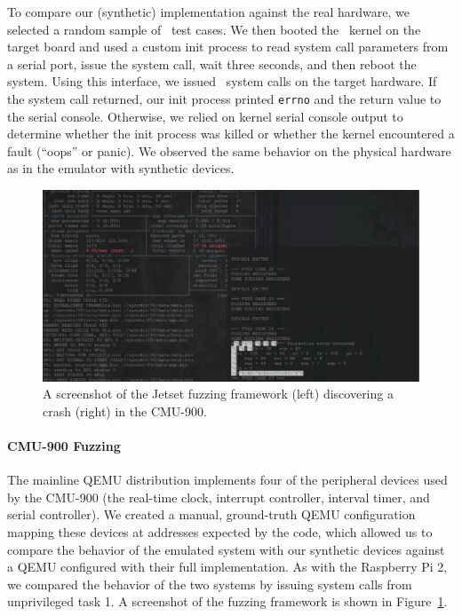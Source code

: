 To compare our (synthetic) implementation against the real hardware, we selected a random sample of \rpiPhysicalTestCases\ test cases.
We then booted the \rpitwo\ kernel on the target board and used a custom init process to read system call parameters from a serial port, issue the system call, wait three seconds, and then reboot the system.
Using this interface, we issued \rpiPhysicalTestCases\ system calls on the target hardware.
If the system call returned, our init process printed \texttt{errno} and the return value to the serial console.
Otherwise, we relied on kernel serial console output to determine whether the init process was killed or whether the kernel encountered a fault (``oops'' or panic).
We observed the same behavior on the physical hardware as in the emulator with synthetic devices.

\begin{figure}[t]
\centering
\includegraphics[width=0.9\linewidth]{fuzzing-output}
\caption{A screenshot of the Jetset fuzzing framework (left) discovering a crash (right) in the CMU-900.}
\label{fig:fuzzing-out}
\end{figure}

\paragraph{CMU-900 Fuzzing}
The mainline QEMU distribution implements four of the peripheral devices used by the CMU-900 (the real-time clock, interrupt controller, interval timer, and serial controller).
We created a manual, ground-truth QEMU configuration mapping these devices at addresses expected by the code, which allowed us to compare the behavior of the emulated system with our synthetic devices against a QEMU configured with their full implementation.
As with the Raspberry Pi 2, we compared the behavior of the two systems by issuing system calls from unprivileged task 1.
A screenshot of the fuzzing framework is shown in Figure~\ref{fig:fuzzing-out}.

